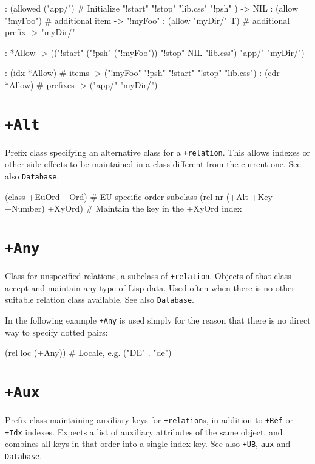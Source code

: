 \begin{wideverbatim}
: (allowed ("app/")  # Initialize
   "!start" "!stop" "lib.css" "!psh" )
-> NIL
: (allow "!myFoo")  # additional item
-> "!myFoo"
: (allow "myDir/" T)  # additional prefix
-> "myDir/"

: *Allow
-> (("!start" ("!psh" ("!myFoo")) "!stop" NIL "lib.css") "app/" "myDir/")

: (idx *Allow)  # items
-> ("!myFoo" "!psh" "!start" "!stop" "lib.css")
: (cdr *Allow)  # prefixes
-> ("app/" "myDir/")
\end{wideverbatim}

 
\section*{\texttt{+Alt}}
\label{sec:func-ref-A-+Alt}


Prefix class specifying an alternative class for a \texttt{+relation}. This
allows indexes or other side effects to be maintained in a class
different from the current one. See also \texttt{Database}.


\begin{wideverbatim}
(class +EuOrd +Ord)                    # EU-specific order subclass
(rel nr (+Alt +Key +Number) +XyOrd)    # Maintain the key in the +XyOrd index
\end{wideverbatim}

 
\section*{\texttt{+Any}}
\label{sec:func-ref-A-+Any}


Class for unspecified relations, a subclass of \texttt{+relation}. Objects of
that class accept and maintain any type of Lisp data. Used often when
there is no other suitable relation class available. See also
\texttt{Database}.

In the following example \texttt{+Any} is used simply for the reason that there
is no direct way to specify dotted pairs:


\begin{wideverbatim}
(rel loc (+Any))  # Locale, e.g. ("DE" . "de")
\end{wideverbatim}

 
\section*{\texttt{+Aux}}
\label{sec:func-ref-A-+Aux}


Prefix class maintaining auxiliary keys for \texttt{+relation}s, in addition to \texttt{+Ref} or \texttt{+Idx} indexes. Expects a list of auxiliary attributes of the
same object, and combines all keys in that order into a single index
key. See also \texttt{+UB}, \texttt{aux} and \texttt{Database}.


